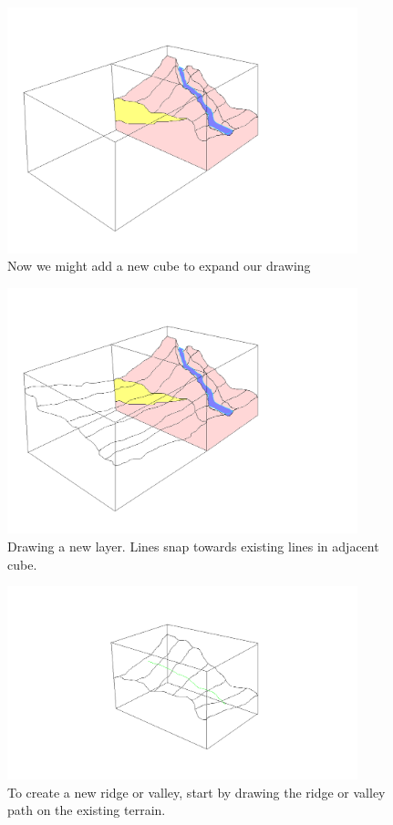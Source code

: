 \documentclass[12pt,a4paper]{article}
\begin{document}
\begin{itemize}
\begin{figure}
\centering
\includegraphics[width=4in]{newCube}
\caption[]{
  \footnotesize
  Now we might add a new cube to expand our drawing
  \label{fig:newCube}
}
\end{figure}

\begin{figure}
\centering
\includegraphics[width=4in]{newCubeLayer}
\caption[]{
  \footnotesize
  Drawing a new layer. Lines snap towards existing lines in adjacent cube.
  \label{fig:newCubeLayer}
}
\end{figure}

\begin{figure}
\centering
\includegraphics[width=4in]{createRidge0}
\caption[]{
  \footnotesize
  To create a new ridge or valley, start by drawing the ridge or valley path on the existing terrain. 
  \label{fig:createRidge0}
}
\end{figure}


\end{itemize}
\end{document}
